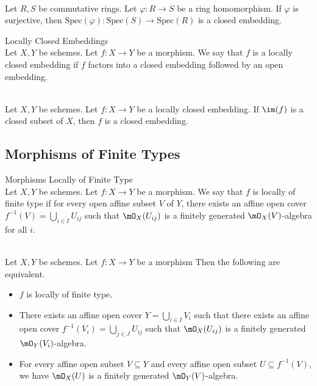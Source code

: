 \documentclass[a4paper]{article}
\begin{document}
\begin{lmm}{}{}\\
Let $R,S$ be commutative rings. Let $\varphi:R\to S$ be a ring homomorphism. If $\varphi$ is surjective, then $\text{Spec}(\varphi):\text{Spec}(S)\to\text{Spec}(R)$ is a closed embedding. 
\end{lmm}

\begin{defn}{Locally Closed Embeddings}{}\\
Let $X,Y$ be schemes. Let $f:X\to Y$ be a morphism. We say that $f$ is a locally closed embedding if $f$ factors into a closed embedding followed by an open embedding. 
\end{defn}

\begin{prp}{}{}\\
Let $X,Y$ be schemes. Let $f:X\to Y$ be a locally closed embedding. If $\im(f)$ is a closed subset of $X$, then $f$ is a closed embedding. 
\end{prp}

\subsection{Morphisms of Finite Types}
\begin{defn}{Morphisms Locally of Finite Type}{}\\
Let $X,Y$ be schemes. Let $f:X\to Y$ be a morphism. We say that $f$ is locally of finite type if for every open affine subset $V$ of $Y$, there exists an affine open cover $f^{-1}(V)=\bigcup_{i\in I}U_{ij}$ such that $\mO_X(U_{ij})$ is a finitely generated $\mO_X(V)$-algebra for all $i$. 
\end{defn}

\begin{prp}{}{}\\
Let $X,Y$ be schemes. Let $f:X\to Y$ be a morphism Then the following are equivalent. 
\begin{itemize}
\item $f$ is locally of finite type. 
\item There exists an affine open cover $Y=\bigcup_{i\in I}V_i$ such that there exists an affine open cover $f^{-1}(V_i)=\bigcup_{j\in J}U_{ij}$ such that $\mO_X(U_{ij})$ is a finitely generated $\mO_Y(V_i)$-algebra. 
\item For every affine open subset $V\subseteq Y$ and every affine open subset $U\subseteq f^{-1}(V)$, we have $\mO_X(U)$ is a finitely generated $\mO_Y(V)$-algebra. 
\end{itemize}
\end{prp}
\end{document}
